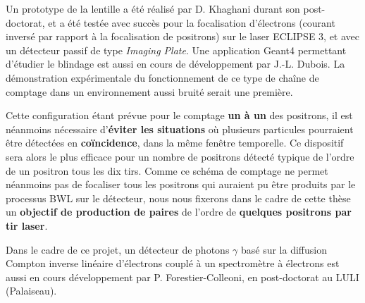 \begin{refsection}
Un prototype de la lentille a été réalisé par D. Khaghani durant son post-doctorat, et a été testée avec succès pour la focalisation d'électrons (courant inversé par rapport à la focalisation de positrons) sur le laser ECLIPSE 3, et avec un détecteur passif de type \textit{Imaging Plate}. Une application Geant4 permettant d'étudier le blindage est aussi en cours de développement par J.-L. Dubois. La démonstration expérimentale du fonctionnement de ce type de chaîne de comptage dans un environnement aussi bruité serait une première.

Cette configuration étant prévue pour le comptage \textbf{un à un} des positrons, il est néanmoins nécessaire d'\textbf{éviter les situations} où plusieurs particules pourraient être détectées en \textbf{coïncidence}, dans la même fenêtre temporelle.  Ce dispositif sera alors le plus efficace pour un nombre de positrons détecté typique de l'ordre de un positron tous les dix tirs. Comme ce schéma de comptage ne permet néanmoins pas de focaliser tous les positrons qui auraient pu être produits par le processus BWL sur le détecteur, nous nous fixerons dans le cadre de cette thèse un \textbf{objectif de production de paires} de l'ordre de \textbf{quelques positrons par tir laser}.


Dans le cadre de ce projet, un détecteur de photons $\gamma$ basé sur la diffusion Compton inverse linéaire d'électrons couplé à un spectromètre à électrons est aussi en cours développement par P. Forestier-Colleoni, en post-doctorat au LULI (Palaiseau). 

\newpage
\printbibliography[heading=subbibintoc]
\end{refsection}
